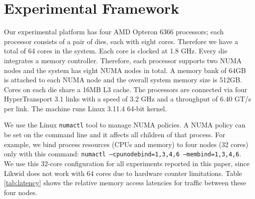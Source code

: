 \section{Experimental Framework}
\label{sec:exp_framework}

Our experimental platform has four AMD Opteron 6366 processors;
each processor consists of a pair of dies, each with eight cores.
Therefore we have a total of 64 cores in the system.
Each core is clocked at 1.8 GHz.
Every die integrates a memory controller.
Therefore, each processor supports two NUMA nodes and the system has eight NUMA nodes in total.
A memory bank of 64GB is attached to each NUMA node and the overall system memory size is 512GB. 
Cores on each die share a 16MB L3 cache.
The processors are connected via four HyperTransport 3.1 links with a speed of 3.2 GHz and a throughput of 6.40 GT/s per link.
The machine runs Linux 3.11.4 64-bit kernel.

We use the Linux \texttt{numactl} tool to manage NUMA policies.
A NUMA policy can be set on the command line and it affects 
all children of that process.
For example, we bind process resources (CPUs and memory) to four nodes
(32 cores)
only with this command: \texttt{numactl --cpunodebind=1,3,4,6 --membind=1,3,4,6}.  
We use this 32-core configuration for all experiments reported in this paper,
since Likwid does not work with 64 cores due to hardware counter limitations.
Table \ref{tab:latency} shows the relative memory access latencies for 
traffic between these four nodes.